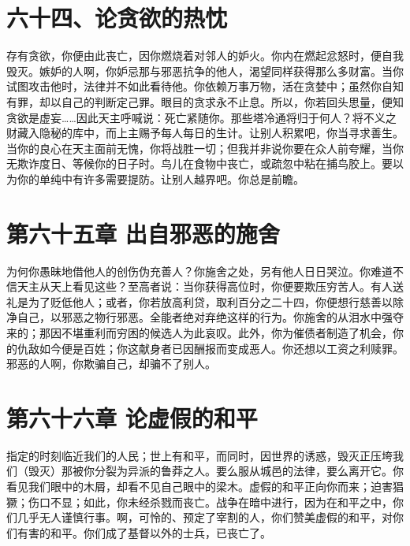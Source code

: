 
\section{六十四、论贪欲的热忱}

存有贪欲，你便由此丧亡，因你燃烧着对邻人的妒火。你内在燃起忿怒时，便自我毁灭。嫉妒的人啊，你妒忌那与邪恶抗争的他人，渴望同样获得那么多财富。当你试图攻击他时，法律并不如此看待他。你依赖万事万物，活在贪婪中；虽然你自知有罪，却以自己的判断定己罪。眼目的贪求永不止息。所以，你若回头思量，便知贪欲是虚妄……因此天主呼喊说：死亡紧随你。那些塔冷通将归于何人？将不义之财藏入隐秘的库中，而上主赐予每人每日的生计。让别人积累吧，你当寻求善生。当你的良心在天主面前无愧，你将战胜一切；但我并非说你要在众人前夸耀，当你无欺诈度日、等候你的日子时。鸟儿在食物中丧亡，或疏忽中粘在捕鸟胶上。要以为你的单纯中有许多需要提防。让别人越界吧。你总是前瞻。\par


\section{第六十五章  出自邪恶的施舍}

为何你愚昧地借他人的创伤伪充善人？你施舍之处，另有他人日日哭泣。你难道不信天主从天上看见这些？至高者说：当你获得高位时，你便要欺压穷苦人。有人送礼是为了贬低他人；或者，你若放高利贷，取利百分之二十四，你便想行慈善以除净自己，以邪恶之物行邪恶。全能者绝对弃绝这样的行为。你施舍的从泪水中强夺来的；那因不堪重利而穷困的候选人为此哀叹。此外，你为催债者制造了机会，你的仇敌如今便是百姓；你这献身者已因酬报而变成恶人。你还想以工资之利赎罪。邪恶的人啊，你欺骗自己，却骗不了别人。\par


\section{第六十六章  论虚假的和平}

指定的时刻临近我们的人民；世上有和平，而同时，因世界的诱惑，毁灭正压垮我们（毁灭）那被你分裂为异派的鲁莽之人。要么服从城邑的法律，要么离开它。你看见我们眼中的木屑，却看不见自己眼中的梁木。虚假的和平正向你而来；迫害猖獗；伤口不显；如此，你未经杀戮而丧亡。战争在暗中进行，因为在和平之中，你们几乎无人谨慎行事。啊，可怜的、预定了宰割的人，你们赞美虚假的和平，对你们有害的和平。你们成了基督以外的士兵，已丧亡了。\par

